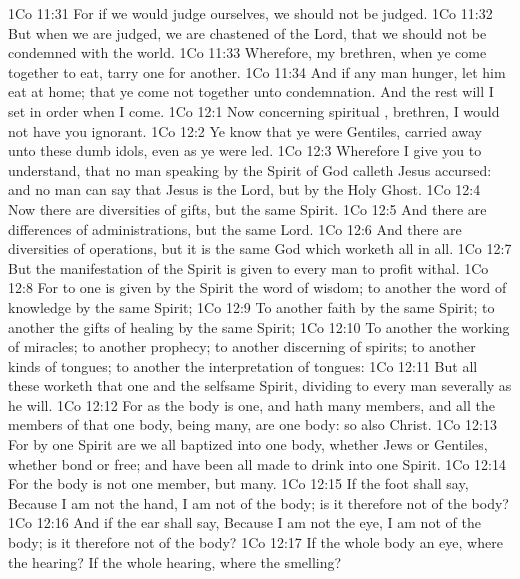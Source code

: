\vs 1Co 11:31 For if we would judge ourselves, we should not be judged.
\vs 1Co 11:32 But when we are judged, we are chastened of the Lord, that we should not be condemned with the world.
\vs 1Co 11:33 Wherefore, my brethren, when ye come together to eat, tarry one for another.
\vs 1Co 11:34 And if any man hunger, let him eat at home; that ye come not together unto condemnation. And the rest will I set in order when I come.
\vs 1Co 12:1 Now concerning spiritual , brethren, I would not have you ignorant.
\vs 1Co 12:2 Ye know that ye were Gentiles, carried away unto these dumb idols, even as ye were led.
\vs 1Co 12:3 Wherefore I give you to understand, that no man speaking by the Spirit of God calleth Jesus accursed: and  no man can say that Jesus is the Lord, but by the Holy Ghost.
\vs 1Co 12:4 Now there are diversities of gifts, but the same Spirit.
\vs 1Co 12:5 And there are differences of administrations, but the same Lord.
\vs 1Co 12:6 And there are diversities of operations, but it is the same God which worketh all in all.
\vs 1Co 12:7 But the manifestation of the Spirit is given to every man to profit withal.
\vs 1Co 12:8 For to one is given by the Spirit the word of wisdom; to another the word of knowledge by the same Spirit;
\vs 1Co 12:9 To another faith by the same Spirit; to another the gifts of healing by the same Spirit;
\vs 1Co 12:10 To another the working of miracles; to another prophecy; to another discerning of spirits; to another  kinds of tongues; to another the interpretation of tongues:
\vs 1Co 12:11 But all these worketh that one and the selfsame Spirit, dividing to every man severally as he will.
\vs 1Co 12:12 For as the body is one, and hath many members, and all the members of that one body, being many, are one body: so also  Christ.
\vs 1Co 12:13 For by one Spirit are we all baptized into one body, whether  Jews or Gentiles, whether  bond or free; and have been all made to drink into one Spirit.
\vs 1Co 12:14 For the body is not one member, but many.
\vs 1Co 12:15 If the foot shall say, Because I am not the hand, I am not of the body; is it therefore not of the body?
\vs 1Co 12:16 And if the ear shall say, Because I am not the eye, I am not of the body; is it therefore not of the body?
\vs 1Co 12:17 If the whole body  an eye, where  the hearing? If the whole  hearing, where  the smelling?
